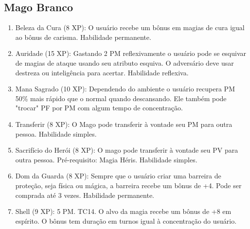  \subsection{Mago Branco}
 
\begin{enumerate}
	\item Beleza da Cura (8 XP): O usuário recebe um bônus em magias de cura igual ao bônus de carisma. Habilidade permanente.

	\item Auridade (15 XP): Gastando 2 PM reflexivamente o usuário pode se esquivar de magias de ataque usando seu atributo esquiva. O adversário deve usar destreza ou inteligência para acertar. Habilidade reflexiva.
	 
		 
	\item Mana Sagrado (10 XP): Dependendo do ambiente o usuário recupera PM 50\% mais rápido que o normal quando descansando. Ele também pode "trocar" PF por PM com algum tempo de concentração.
 
	\item Transferir (8 XP): O Mago pode transferir à vontade seu PM para outra pessoa. Habilidade simples. 
 
	\item Sacrifício do Herói (8 XP): O mago pode transferir à vontade seu PV para outra pessoa. Pré-requisito: Magia Héris. Habilidade simples.
 	
		
	\item Dom da Guarda (8 XP): Sempre que o usuário criar uma barreira de proteção, seja física ou mágica, a barreira recebe um bônus de +4. Pode ser comprada até 3 vezes. Habilidade permanente.
	
		\item Shell (9 XP): 5 PM. TC14.\newline
O alvo da magia recebe um bônus de +8 em espírito. O bônus tem duração em turnos igual à concentração do usuário.
	

\end{enumerate}
